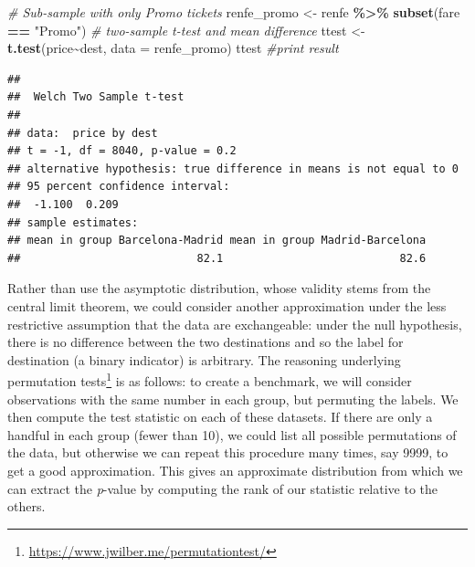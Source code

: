 \documentclass[
  11pt,
  letterpaper,
]{book}
\newenvironment{Shaded}{\begin{snugshade}}{\end{snugshade}}
\newcommand{\CommentTok}[1]{\textcolor[rgb]{0.56,0.35,0.01}{\textit{#1}}}
\newcommand{\DataTypeTok}[1]{\textcolor[rgb]{0.13,0.29,0.53}{#1}}
\newcommand{\KeywordTok}[1]{\textcolor[rgb]{0.13,0.29,0.53}{\textbf{#1}}}
\newcommand{\NormalTok}[1]{#1}
\newcommand{\OperatorTok}[1]{\textcolor[rgb]{0.81,0.36,0.00}{\textbf{#1}}}
\newcommand{\StringTok}[1]{\textcolor[rgb]{0.31,0.60,0.02}{#1}}
\renewcommand{\href}[2]{#2\footnote{\url{#1}}}
\theoremstyle{definition}
\theoremstyle{definition}
\theoremstyle{definition}
\theoremstyle{remark}
\begin{document}
\begin{Shaded}
\begin{Highlighting}[]
\CommentTok{\# Sub{-}sample with only Promo tickets}
\NormalTok{renfe\_promo \textless{}{-}}\StringTok{ }\NormalTok{renfe }\OperatorTok{\%\textgreater{}\%}\StringTok{ }\KeywordTok{subset}\NormalTok{(fare }\OperatorTok{==}\StringTok{ "Promo"}\NormalTok{)}
\CommentTok{\# two{-}sample t{-}test and mean difference}
\NormalTok{ttest \textless{}{-}}\StringTok{ }\KeywordTok{t.test}\NormalTok{(price}\OperatorTok{\textasciitilde{}}\NormalTok{dest, }\DataTypeTok{data =}\NormalTok{ renfe\_promo)}
\NormalTok{ttest }\CommentTok{\#print result}
\end{Highlighting}
\end{Shaded}

\begin{verbatim}
## 
## 	Welch Two Sample t-test
## 
## data:  price by dest
## t = -1, df = 8040, p-value = 0.2
## alternative hypothesis: true difference in means is not equal to 0
## 95 percent confidence interval:
##  -1.100  0.209
## sample estimates:
## mean in group Barcelona-Madrid mean in group Madrid-Barcelona 
##                           82.1                           82.6
\end{verbatim}

Rather than use the asymptotic distribution, whose validity stems from the central limit theorem, we could consider another approximation under the less restrictive assumption that the data are exchangeable: under the null hypothesis, there is no difference between the two destinations and so the label for destination (a binary indicator) is arbitrary. The reasoning underlying \href{https://www.jwilber.me/permutationtest/}{permutation tests} is as follows: to create a benchmark, we will consider observations with the same number in each group, but permuting the labels. We then compute the test statistic on each of these datasets. If there are only a handful in each group (fewer than 10), we could list all possible permutations of the data, but otherwise we can repeat this procedure many times, say 9999, to get a good approximation. This gives an approximate distribution from which we can extract the \emph{p}-value by computing the rank of our statistic relative to the others.
\end{document}
